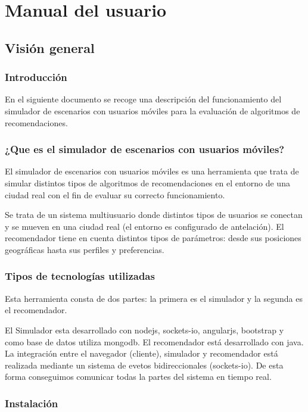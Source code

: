 \chapter{Manual del usuario}

\section{Visión general}

\subsection{Introducción}

En el siguiente documento se recoge una descripción del funcionamiento del simulador de escenarios con usuarios móviles para la evaluación de algoritmos de recomendaciones.

\subsection{¿Que es el simulador de escenarios con usuarios móviles?}

El simulador de escenarios con usuarios móviles es una herramienta que trata de simular distintos tipos de algoritmos de recomendaciones en el entorno de una ciudad real con el fin de evaluar su correcto funcionamiento.

Se trata de un sistema multiusuario donde distintos tipos de usuarios se conectan y se mueven en una ciudad real (el entorno es configurado de antelación). El recomendador tiene en cuenta distintos tipos de parámetros: desde sus posiciones geográficas hasta sus perfiles y preferencias.

\subsection{Tipos de tecnologías utilizadas}

Esta herramienta consta de dos partes: la primera es el simulador y la segunda es el recomendador.

El Simulador esta desarrollado con nodejs, sockets-io, angularjs, bootstrap y como base de datos utiliza mongodb. El recomendador está desarrollado con java. La integración entre el navegador (cliente), simulador y recomendador está realizada mediante un sistema de evetos bidireccionales (sockets-io). De esta forma conseguimos comunicar todas la partes del sistema en tiempo real.

\subsection{Instalación}

